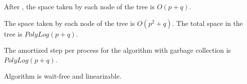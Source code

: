 \begin{lemma}
    After , the space taken by each node of the tree is $O(p+q)$.
\end{lemma}

\begin{corollary}
The space taken by each node of the tree is $O(p^2+q)$. The total space in the tree is $PolyLog(p+q)$.
\end{corollary}

\begin{lemma}
  The amortized step per process for the algorithm with garbage collection is $PolyLog(p+q)$.
\end{lemma}

\begin{lemma}
  Algorithm is wait-free and linearizable.
\end{lemma}


